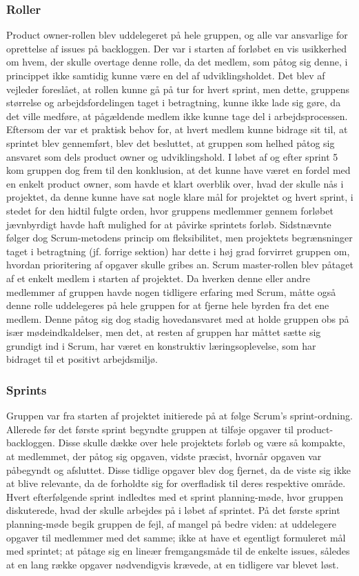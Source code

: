 \subsubsection{Roller}
Product owner-rollen blev uddelegeret på hele gruppen, og alle var ansvarlige for oprettelse af issues på backloggen. Der var i starten af forløbet en vis usikkerhed om hvem, der skulle overtage denne rolle, da det medlem, som påtog sig denne, i princippet ikke samtidig kunne være en del af udviklingsholdet. Det blev af vejleder foreslået, at rollen kunne gå på tur for hvert sprint, men dette, gruppens størrelse og arbejdsfordelingen taget i betragtning, kunne ikke lade sig gøre, da det ville medføre, at pågældende medlem ikke kunne tage del i arbejdsprocessen. Eftersom der var et praktisk behov for, at hvert medlem
kunne bidrage sit til, at sprintet blev gennemført, blev det besluttet, at gruppen som helhed påtog sig ansvaret som dels product owner og udviklingshold. I løbet af og efter sprint 5 kom gruppen dog frem til den konklusion, at det kunne have været en fordel med en enkelt product owner, som havde et klart overblik over, hvad der skulle nås i projektet, da denne kunne have sat nogle klare mål for projektet og hvert sprint, i stedet for den hidtil fulgte orden, hvor gruppens medlemmer gennem forløbet jævnbyrdigt havde haft mulighed for at påvirke sprintets forløb. Sidstnævnte følger dog Scrum-metodens princip om fleksibilitet, men
projektets begrænsninger taget i betragtning (jf. forrige sektion) har dette i høj grad forvirret gruppen om, hvordan prioritering af opgaver skulle gribes an. Scrum master-rollen blev påtaget af et enkelt medlem i starten af projektet. Da hverken denne eller andre medlemmer af gruppen havde nogen tidligere erfaring med Scrum, måtte også denne rolle uddelegeres på hele gruppen for at fjerne hele byrden fra det ene medlem. Denne påtog sig dog stadig hovedansvaret med at holde gruppen
obs på især mødeindkaldelser, men det, at resten af gruppen har måttet sætte sig grundigt ind i Scrum, har været en konstruktiv læringsoplevelse, som har bidraget til et positivt arbejdsmiljø.

\subsubsection{Sprints}
Gruppen var fra starten af projektet initierede på at følge Scrum's sprint-ordning. Allerede før det første sprint begyndte gruppen at tilføje opgaver til product-backloggen. Disse skulle dække over hele projektets forløb og være så kompakte, at medlemmet, der påtog sig opgaven, vidste præcist, hvornår opgaven var påbegyndt og afsluttet. Disse tidlige opgaver blev dog fjernet, da de viste sig ikke at blive relevante, da de forholdte sig for overfladisk til deres respektive område. Hvert efterfølgende sprint indledtes med et sprint planning-møde, hvor gruppen diskuterede, hvad der skulle arbejdes på i løbet af sprintet. På det første sprint planning-møde begik gruppen de fejl, af mangel på bedre viden: at uddelegere opgaver til medlemmer med det samme; ikke at have et egentligt formuleret mål med sprintet; at påtage sig en lineær fremgangsmåde til de enkelte issues, således at en lang række opgaver nødvendigvis krævede, at en tidligere var blevet løst.

